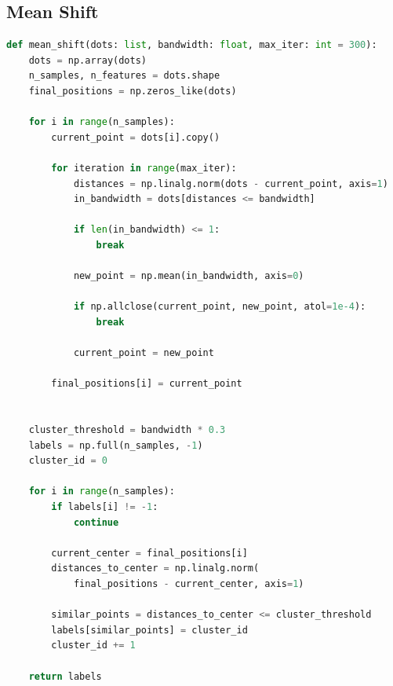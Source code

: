 \documentclass[12pt,a4paper]{article}
\begin{document}
\subsection{Mean Shift}
\begin{lstlisting}[language=Python, caption=Реалізація Mean Shift]
def mean_shift(dots: list, bandwidth: float, max_iter: int = 300):
    dots = np.array(dots)
    n_samples, n_features = dots.shape
    final_positions = np.zeros_like(dots)
    
    for i in range(n_samples):
        current_point = dots[i].copy()
        
        for iteration in range(max_iter):
            distances = np.linalg.norm(dots - current_point, axis=1)
            in_bandwidth = dots[distances <= bandwidth]
            
            if len(in_bandwidth) <= 1:
                break
            
            new_point = np.mean(in_bandwidth, axis=0)
            
            if np.allclose(current_point, new_point, atol=1e-4):
                break
                
            current_point = new_point
        
        final_positions[i] = current_point
    

    cluster_threshold = bandwidth * 0.3
    labels = np.full(n_samples, -1)
    cluster_id = 0
    
    for i in range(n_samples):
        if labels[i] != -1:
            continue
            
        current_center = final_positions[i]
        distances_to_center = np.linalg.norm(
            final_positions - current_center, axis=1)
        
        similar_points = distances_to_center <= cluster_threshold
        labels[similar_points] = cluster_id
        cluster_id += 1
    
    return labels
\end{lstlisting}
\end{document}
